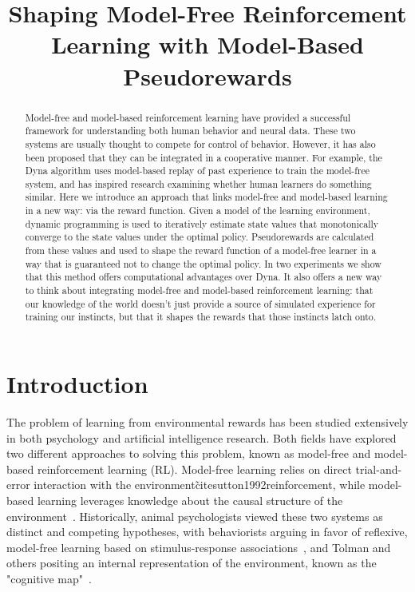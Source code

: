 \documentclass[letterpaper]{article}
\begin{document}
%

\title{Shaping Model-Free Reinforcement Learning with Model-Based Pseudorewards}
\date{}
\maketitle
\begin{abstract}
Model-free and model-based reinforcement learning have provided a successful framework for understanding both human behavior and neural data. These two systems are usually thought to compete for control of behavior. However, it has also been proposed that they can be integrated in a cooperative manner. For example, the Dyna algorithm uses model-based replay of past experience to train the model-free system, and has inspired research examining whether human learners do something similar. Here we introduce an approach that links model-free and model-based learning in a new way: via the reward function. Given a model of the learning environment, dynamic programming is used to iteratively estimate state values that monotonically converge to the state values under the optimal policy. Pseudorewards are calculated from these values and used to shape the reward function of a model-free learner in a way that is guaranteed not to change the optimal policy. In two experiments we show that this method offers computational advantages over Dyna. It also offers a new way to think about integrating model-free and model-based reinforcement learning: that our knowledge of the world doesn't just provide a source of simulated experience for training our instincts, but that it shapes the rewards that those instincts latch onto.
\end{abstract}

\section{Introduction}

The problem of learning from environmental rewards has been studied extensively in both psychology and artificial intelligence research. Both fields have explored two different approaches to solving this problem, known as model-free and model-based reinforcement learning (RL). Model-free learning relies on direct trial-and-error interaction with the environment\~cite{sutton1992reinforcement}, while model-based learning leverages knowledge about the causal structure of the environment~\cite{barto1995learning}. Historically, animal psychologists viewed these two systems as distinct and competing hypotheses, with behaviorists arguing in favor of reflexive, model-free learning based on stimulus-response associations~\cite{thorndike1933proof}, and Tolman and others positing an internal representation of the environment, known as the "cognitive map"~\cite{tolman1948cognitive}.
\end{document}
